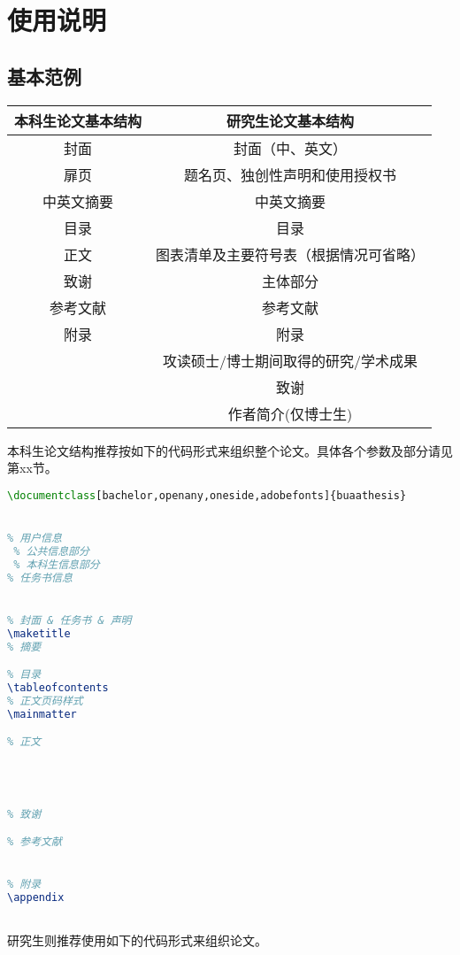 \chapter{使用说明}
\section{基本范例}
\begin{table}
\begin{center}
    \begin{tabular}{c||c}
    \hline
    本科生论文基本结构 & 研究生论文基本结构\\\hline\hline
    封面 & 封面（中、英文）\\
    扉页 & 题名页、独创性声明和使用授权书\\
    中英文摘要 & 中英文摘要\\
    目录 & 目录\\
    正文 & 图表清单及主要符号表（根据情况可省略）\\
    致谢 & 主体部分\\
    参考文献 & 参考文献\\
    附录 & 附录\\
    ~~ & 攻读硕士/博士期间取得的研究\slash 学术成果\\
    ~~ & 致谢\\
    ~~ & 作者简介(仅博士生)\\
    \hline
    \end{tabular}
\end{center}
\end{table}
\qquad 本科生论文结构推荐按如下的代码形式来组织整个论文。具体各个参数及部分请见第xx节。

\begin{lstlisting}[language={LaTeX}]
% !Mode:: "TeX:UTF-8"
\documentclass[bachelor,openany,oneside,adobefonts]{buaathesis}


% 用户信息
 % 公共信息部分
 % 本科生信息部分
% 任务书信息


% 封面 & 任务书 & 声明
\maketitle
% 摘要

% 目录
\tableofcontents
% 正文页码样式
\mainmatter

% 正文




% 致谢

% 参考文献


% 附录
\appendix



\end{lstlisting}
\qquad 研究生则推荐使用如下的代码形式来组织论文。

